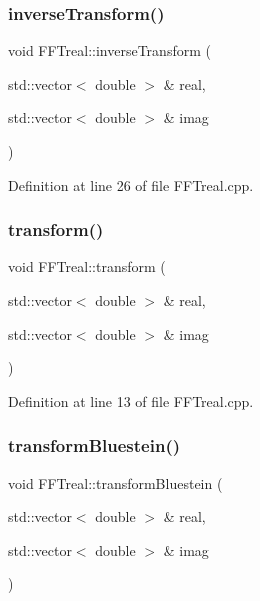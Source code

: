 \subsubsection{\texorpdfstring{inverse\+Transform()}{inverseTransform()}}
{\footnotesize\ttfamily void F\+F\+Treal\+::inverse\+Transform (\begin{DoxyParamCaption}\item[{std\+::vector$<$ double $>$ \&}]{real,  }\item[{std\+::vector$<$ double $>$ \&}]{imag }\end{DoxyParamCaption})}



Definition at line 26 of file F\+F\+Treal.\+cpp.

\mbox{\label{class_f_f_treal_a16caf75d31c313da4c6c1659497434c2}} 
\subsubsection{\texorpdfstring{transform()}{transform()}}
{\footnotesize\ttfamily void F\+F\+Treal\+::transform (\begin{DoxyParamCaption}\item[{std\+::vector$<$ double $>$ \&}]{real,  }\item[{std\+::vector$<$ double $>$ \&}]{imag }\end{DoxyParamCaption})}



Definition at line 13 of file F\+F\+Treal.\+cpp.

\mbox{\label{class_f_f_treal_a05861961bccf522231faf434b806e882}} 
\subsubsection{\texorpdfstring{transform\+Bluestein()}{transformBluestein()}}
{\footnotesize\ttfamily void F\+F\+Treal\+::transform\+Bluestein (\begin{DoxyParamCaption}\item[{std\+::vector$<$ double $>$ \&}]{real,  }\item[{std\+::vector$<$ double $>$ \&}]{imag }\end{DoxyParamCaption})}



